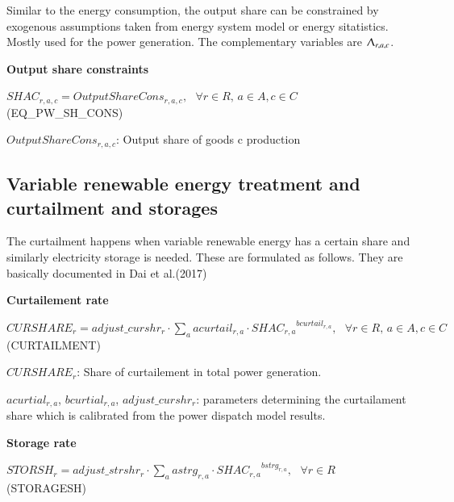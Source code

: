 \documentclass[10pt,a4paper,titlepage,dvipdfmx]{book}
\begin{document}
Similar to the energy consumption, the output share can be constrained by exogenous assumptions taken from energy system model or energy sitatistics. Mostly used for the power generation. The complementary variables are $\Uplambda _{r,a,c}$.

\begin{flushleft}\textbf{Output share constraints}\end{flushleft}


\begin{center}$SHAC_{r,a,c}=OutputShareCons_{r,a,c},\,\,\,\,\forall r\in R,\,a\in A, c\in C$ (EQ\_PW\_SH\_CONS)
\end{center}

\begin{flushleft} $OutputShareCons_{r,a,c}$: Output share of goods c production \end{flushleft}

\subsection{\label{subsecVRETrCurSto}Variable renewable energy treatment and curtailment and storages}

The curtailment happens when variable renewable energy has a certain share and similarly electricity storage is needed. These are formulated as follows. They are basically documented in Dai et al.(2017)~\cite{RN4379}

\begin{flushleft}\textbf{Curtailement rate}\end{flushleft}


\begin{center}$CURSHARE_{r}=adjust\_ curshr_{r}\cdot \sum _{a}acurtail_{r,a}\cdot {SHAC_{r,a}}^{bcurtail_{r,a}},\,\,\,\,\forall r\in R,\,a\in A, c\in C$ (CURTAILMENT)
\end{center}

\begin{flushleft}
$CURSHARE_{r}$: Share of curtailement in total power generation.

$acurtial_{r,a}$, $bcurtial_{r,a}$, $adjust\_curshr_{r}$: parameters determining the curtailament share which is calibrated from the power dispatch model results.
\end{flushleft}

\begin{flushleft}\textbf{Storage rate}\end{flushleft}


\begin{center}$STORSH_{r}=adjust\_ strshr_{r}\cdot \sum _{a} astrg_{r,a}\cdot {SHAC_{r,a}}^{{bstrg_{r,a}}},\,\,\,\,\forall r\in R$ (STORAGESH)
\end{center}
\end{document}
